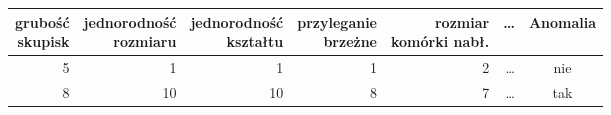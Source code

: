 \begin{tabular}{rrrrrrc}
\toprule
\makecell{grubość\\skupisk} & \makecell{jednorodność\\rozmiaru} & \makecell{jednorodność\\kształtu} & \makecell{przyleganie\\brzeżne} & \makecell{rozmiar\\komórki nabł.} & \dots & Anomalia \\
\midrule
5 & 1 & 1 & 1 & 2 & \dots & nie \\
8 & 10 & 10 & 8 & 7 & \dots & tak \\
\bottomrule
\end{tabular}
